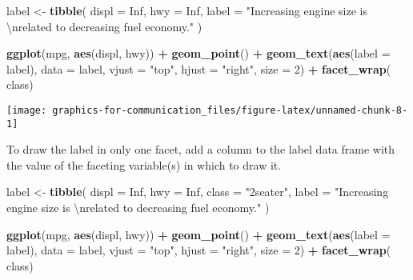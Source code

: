 \documentclass[]{book}
\newenvironment{Shaded}{\begin{snugshade}}{\end{snugshade}}
\newcommand{\CharTok}[1]{\textcolor[rgb]{0.31,0.60,0.02}{#1}}
\newcommand{\DataTypeTok}[1]{\textcolor[rgb]{0.13,0.29,0.53}{#1}}
\newcommand{\DecValTok}[1]{\textcolor[rgb]{0.00,0.00,0.81}{#1}}
\newcommand{\KeywordTok}[1]{\textcolor[rgb]{0.13,0.29,0.53}{\textbf{#1}}}
\newcommand{\NormalTok}[1]{#1}
\newcommand{\OperatorTok}[1]{\textcolor[rgb]{0.81,0.36,0.00}{\textbf{#1}}}
\newcommand{\OtherTok}[1]{\textcolor[rgb]{0.56,0.35,0.01}{#1}}
\newcommand{\StringTok}[1]{\textcolor[rgb]{0.31,0.60,0.02}{#1}}
\theoremstyle{plain}
\theoremstyle{remark}
\theoremstyle{definition}
\theoremstyle{definition}
\theoremstyle{definition}
\theoremstyle{remark}
\begin{document}
\begin{Shaded}
\begin{Highlighting}[]
\NormalTok{label <-}\StringTok{ }\KeywordTok{tibble}\NormalTok{(}
  \DataTypeTok{displ =} \OtherTok{Inf}\NormalTok{,}
  \DataTypeTok{hwy =} \OtherTok{Inf}\NormalTok{,}
  \DataTypeTok{label =} \StringTok{"Increasing engine size is }\CharTok{\textbackslash{}n}\StringTok{related to decreasing fuel economy."}
\NormalTok{)}

\KeywordTok{ggplot}\NormalTok{(mpg, }\KeywordTok{aes}\NormalTok{(displ, hwy)) }\OperatorTok{+}
\StringTok{  }\KeywordTok{geom_point}\NormalTok{() }\OperatorTok{+}
\StringTok{  }\KeywordTok{geom_text}\NormalTok{(}\KeywordTok{aes}\NormalTok{(}\DataTypeTok{label =}\NormalTok{ label), }\DataTypeTok{data =}\NormalTok{ label, }\DataTypeTok{vjust =} \StringTok{"top"}\NormalTok{, }\DataTypeTok{hjust =} \StringTok{"right"}\NormalTok{,}
            \DataTypeTok{size =} \DecValTok{2}\NormalTok{) }\OperatorTok{+}
\StringTok{  }\KeywordTok{facet_wrap}\NormalTok{(}\OperatorTok{~}\StringTok{ }\NormalTok{class)}
\end{Highlighting}
\end{Shaded}

\begin{center}\texttt{[image: graphics-for-communication\_files/figure-latex/unnamed-chunk-8-1]} \end{center}

To draw the label in only one facet, add a column to the label data
frame with the value of the faceting variable(s) in which to draw it.

\begin{Shaded}
\begin{Highlighting}[]
\NormalTok{label <-}\StringTok{ }\KeywordTok{tibble}\NormalTok{(}
  \DataTypeTok{displ =} \OtherTok{Inf}\NormalTok{,}
  \DataTypeTok{hwy =} \OtherTok{Inf}\NormalTok{,}
  \DataTypeTok{class =} \StringTok{"2seater"}\NormalTok{,}
  \DataTypeTok{label =} \StringTok{"Increasing engine size is }\CharTok{\textbackslash{}n}\StringTok{related to decreasing fuel economy."}
\NormalTok{)}

\KeywordTok{ggplot}\NormalTok{(mpg, }\KeywordTok{aes}\NormalTok{(displ, hwy)) }\OperatorTok{+}
\StringTok{  }\KeywordTok{geom_point}\NormalTok{() }\OperatorTok{+}
\StringTok{  }\KeywordTok{geom_text}\NormalTok{(}\KeywordTok{aes}\NormalTok{(}\DataTypeTok{label =}\NormalTok{ label), }\DataTypeTok{data =}\NormalTok{ label, }\DataTypeTok{vjust =} \StringTok{"top"}\NormalTok{, }\DataTypeTok{hjust =} \StringTok{"right"}\NormalTok{,}
            \DataTypeTok{size =} \DecValTok{2}\NormalTok{) }\OperatorTok{+}
\StringTok{  }\KeywordTok{facet_wrap}\NormalTok{(}\OperatorTok{~}\StringTok{ }\NormalTok{class)}
\end{Highlighting}
\end{Shaded}
\end{document}
